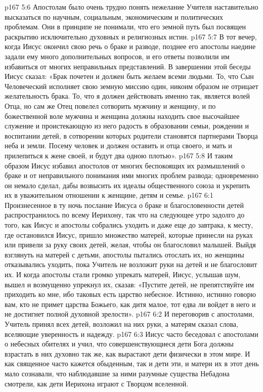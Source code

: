\vs p167 5:6 Апостолам было очень трудно понять нежелание Учителя наставительно высказаться по научным, социальным, экономическим и политических проблемам. Они в принципе не понимали, что его земной путь был посвящен раскрытию исключительно духовных и религиозных истин.
\vs p167 5:7 В тот вечер, когда Иисус окончил свою речь о браке и разводе, позднее его апостолы наедине задали ему много дополнительных вопросов, и его ответы позволили им избавиться от многих неправильных представлений. В завершении этой беседы Иисус сказал: «Брак почетен и должен быть желаем всеми людьми. То, что Сын Человеческий исполняет свою земную миссию один, никоим образом не отрицает желательность брака. То, что я должен действовать именно так, является волей Отца, но сам же Отец повелел сотворить мужчину и женщину, и по божественной воле мужчина и женщина должны находить свое высочайшее служение и проистекающую из него радость в образовании семьи, рождении и воспитании детей, в сотворении которых родители становятся партнерами Творца неба и земли. Посему человек и должен оставить и отца своего, и мать и прилепиться к жене своей, и будут два одною плотью».
\vs p167 5:8 И таким образом Иисус избавил апостолов от многих беспокоящих их размышлений о браке и от неправильного понимания ими многих проблем развода; одновременно он немало сделал, дабы возвысить их идеалы общественного союза и укрепить их в уважительном отношении к женщине, детям и семье.
\vs p167 6:1 Произнесенное в ту ночь послание Иисуса о браке и благословенности детей распространилось по всему Иерихону, так что на следующее утро задолго до того, как Иисус и апостолы собрались уходить и даже еще до завтрака, к месту, где остановился Иисус, пришло множество матерей, которые принесли на руках или привели за руку своих детей, желая, чтобы он благословил малышей. Выйдя взглянуть на матерей с детьми, апостолы пытались отослать их, но женщины отказывались уходить, пока Учитель не возложит руки на детей и не благословит их. И когда апостолы стали громко упрекать матерей, Иисус, услышав шум, вышел и возмущенно упрекнул их, сказав: «Пустите детей, не препятствуйте им приходить ко мне, ибо таковых есть царство небесное. Истинно, истинно говорю вам, кто не примет царства Божьего, как дитя малое, тот едва ли войдет в него и не достигнет полной духовной зрелости».
\vs p167 6:2 И переговорив с апостолами, Учитель принял всех детей, возложил на них руки, а матерям сказал слова, вселяющие уверенность и надежду.
\vs p167 6:3 \pc Иисус часто беседовал с апостолами о небесных обителях и учил, что совершенствующиеся дети Бога должны взрастать в них духовно так же, как вырастают дети физически в этом мире. И как священное часто кажется обыденным, так и дети эти, и матери их в этот день мало сознавали, что наблюдавшие за ними разумные существа Небадона смотрели, как дети Иерихона играют с Творцом вселенной.
